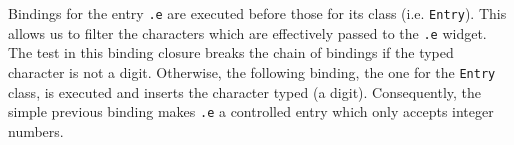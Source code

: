 Bindings for the entry \texttt{.e} are executed before those for its
class (i.e. \texttt{Entry}). This allows us to filter the characters
which are effectively passed to the \texttt{.e} widget. The test in this
binding closure breaks the chain of bindings if the typed character is
not a digit. Otherwise, the following binding, the one for the
\texttt{Entry} class, is executed and inserts the character typed (a
digit).
Consequently, the simple previous binding makes \texttt{.e} a
controlled entry which only accepts integer numbers.





